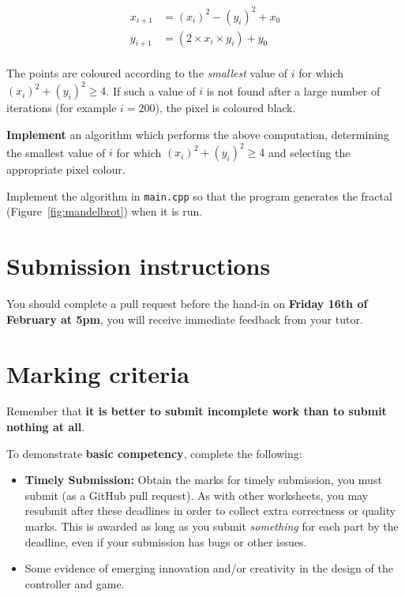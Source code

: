 \documentclass{../../../fal_assignment}
\begin{document}
\begin{align*}
x_{i+1} &= (x_i)^2 - (y_i)^2 + x_0 \\
y_{i+1} &= (2 \times x_i \times y_i) + y_0 \\
\end{align*}

The points are coloured according to the \emph{smallest} value of $i$ for which $(x_i)^2 + (y_i)^2 \geq 4$.
If such a value of $i$ is not found after a large number of iterations (for example $i=200$), the pixel is coloured black.

\textbf{Implement} an algorithm which performs the above computation, determining the smallest value of $i$
for which $(x_i)^2 + (y_i)^2 \geq 4$ and selecting the appropriate pixel colour.

Implement the algorithm in \texttt{main.cpp} so that the program generates the fractal (Figure~\ref{fig:mandelbrot}) when it is run.

\section*{Submission instructions}

You should complete a pull request before the hand-in on \textbf{Friday 16th of February at 5pm}, you will receive immediate feedback from your tutor. 
	
\section*{Marking criteria}
	
	Remember that \textbf{it is better to submit incomplete work than to submit nothing at all}. 
	
	To demonstrate \textbf{basic competency}, complete the following:
	\begin{itemize}
		\item \textbf{Timely Submission:} Obtain the marks for timely submission, you must submit (as a GitHub pull request).
		As with other worksheets, you may resubmit after these deadlines in order to collect extra correctness or quality marks.
		This is awarded as long as you submit \emph{something} for each part by the deadline,
		even if your submission has bugs or other issues.
		\item Some evidence of emerging innovation and/or creativity in the design of the controller and game.
	\end{itemize} 
	
\end{document}
